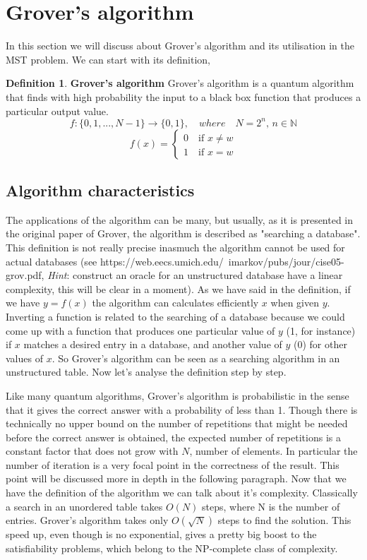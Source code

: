 \documentclass[main.tex]{subfiles}
\theoremstyle{definition}
\newtheorem{definition}{Definition}[section]
\begin{document}
\section{Grover's algorithm}
In this section we will discuss about Grover's algorithm and its 
utilisation in the MST problem.
We can start with its definition,
\theoremstyle{definition}
	\begin{definition}{\textbf{Grover's algorithm}}
	Grover's algorithm is a quantum algorithm that finds with high 
	probability the input to a black box function that produces a 
	particular output value.
	$$f:\{0, 1, ..., N-1\}\rightarrow\{0,1\},\quad where \quad N=2^{n}\textit{, }n\in\mathbb{N}$$ 
	\[
    f(x)=\left\{
                \begin{array}{ll}
                  0 \quad\text{if }x \neq w\\
                  1 \quad\text{if }x = w
                \end{array}
              \right.
  \]
	\end{definition}
	
	\subsection{Algorithm characteristics}
The applications of the algorithm can be many, but usually, as it is presented in the original paper of Grover, the algorithm
is described as "searching a database". This definition is not really precise inasmuch the algorithm cannot be used for actual databases (see https://web.eecs.umich.edu/~imarkov/pubs/jour/cise05-grov.pdf, \textit{Hint}: construct an oracle for an unstructured database have a linear complexity, this will be clear in a moment). As we have said in the definition, if we have $y=f(x)$ the algorithm can calculates efficiently $x$ when given $y$.
Inverting a function is related to the searching of a database because we could come up with a function that produces one particular value of $y$ (1, for instance) if $x$ matches a desired entry in a database, and another value of $y$ (0) for other values of $x$. So Grover's algorithm can be seen as a searching algorithm in an unstructured table.
Now let's analyse the definition step by step. 

Like many quantum algorithms, Grover's algorithm is probabilistic in the sense that it 
gives the correct answer with a probability of less than 1. Though there is technically no upper bound on the number of repetitions that might be needed before the correct answer is obtained, the expected number of repetitions is a constant factor that does not grow with $N$, number of elements.
In particular the number of iteration is a very focal point in the correctness of the result. This point will be discussed more in depth in the following paragraph.
Now that we have the definition of the algorithm we can talk about it's complexity. Classically a search in an unordered table takes $O(N)$ steps, where N is the number of entries. Grover's algorithm takes only $O(\sqrt{N})$ steps to find the solution. This speed up, even though is no exponential, gives a pretty big boost to the satisfiability problems, which belong to the NP-complete class of complexity.
\end{document}
